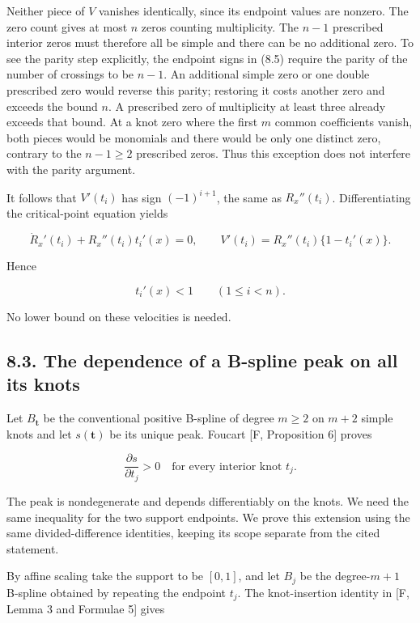 \documentclass[11pt]{article}
\begin{document}
Neither piece of \(V\) vanishes identically, since its endpoint values
are nonzero. The zero count gives at most \(n\) zeros counting
multiplicity. The \(n-1\) prescribed interior zeros must therefore all
be simple and there can be no additional zero. To see the parity step
explicitly, the endpoint signs in (8.5) require the parity of the number
of crossings to be \(n-1\). An additional simple zero or one double
prescribed zero would reverse this parity; restoring it costs another
zero and exceeds the bound \(n\). A prescribed zero of multiplicity at
least three already exceeds that bound. At a knot zero where the first
\(m\) common coefficients vanish, both pieces would be monomials and
there would be only one distinct zero, contrary to the \(n-1\ge2\)
prescribed zeros. Thus this exception does not interfere with the parity
argument.

It follows that \(V'(t_i)\) has sign \((-1)^{i+1}\), the same as
\(R_x''(t_i)\). Differentiating the critical-point equation yields

\[
\dot R_x'(t_i)+R_x''(t_i)t_i'(x)=0,
\qquad
V'(t_i)=R_x''(t_i)\{1-t_i'(x)\}.
\]

Hence

\[
t_i'(x)<1\qquad(1\le i<n).
\tag{8.6}
\]

No lower bound on these velocities is needed.

\subsection{8.3. The dependence of a B-spline peak on all its
knots}\label{the-dependence-of-a-b-spline-peak-on-all-its-knots}

Let \(B_{\mathbf t}\) be the conventional positive B-spline of degree
\(m\ge2\) on \(m+2\) simple knots and let \(s(\mathbf t)\) be its unique
peak. Foucart {[}F, Proposition 6{]} proves

\[
\frac{\partial s}{\partial t_j}>0
\quad\text{for every interior knot }t_j.
\tag{8.7}
\]

The peak is nondegenerate and depends differentiably on the knots. We
need the same inequality for the two support endpoints. We prove this
extension using the same divided-difference identities, keeping its
scope separate from the cited statement.

By affine scaling take the support to be \([0,1]\), and let \(B_j\) be
the degree-\(m+1\) B-spline obtained by repeating the endpoint \(t_j\).
The knot-insertion identity in {[}F, Lemma 3 and Formulae 5{]} gives
\end{document}
